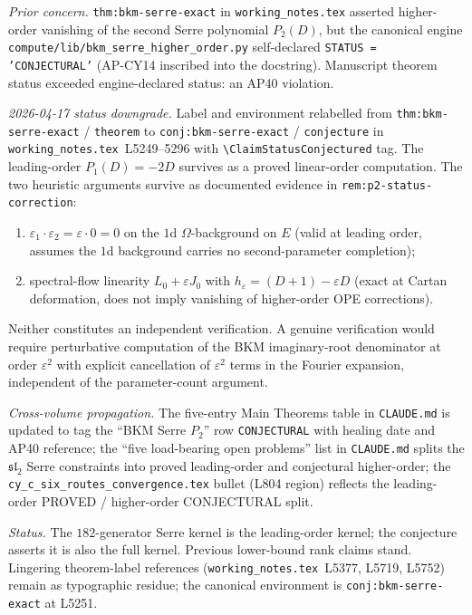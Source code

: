 \emph{Prior concern.}  \texttt{thm:bkm-serre-exact} in
\texttt{working\_notes.tex} asserted higher-order vanishing of the
second Serre polynomial $P_2(D)$, but the canonical engine
\texttt{compute/lib/bkm\_serre\_higher\_order.py} self-declared
\texttt{STATUS = 'CONJECTURAL'} (AP-CY14 inscribed into the docstring).
Manuscript theorem status exceeded engine-declared status: an AP40
violation.

\emph{2026-04-17 status downgrade.}  Label and environment relabelled
from \texttt{thm:bkm-serre-exact} / \texttt{theorem} to
\texttt{conj:bkm-serre-exact} / \texttt{conjecture} in
\texttt{working\_notes.tex}~L5249--5296 with
\texttt{\textbackslash ClaimStatusConjectured} tag.  The leading-order
$P_1(D) = -2D$ survives as a proved linear-order computation.  The
two heuristic arguments survive as documented evidence in
\texttt{rem:p2-status-correction}:
\begin{enumerate}[label=\textup{(\roman*)}]
 \item $\varepsilon_1 \cdot \varepsilon_2 = \varepsilon \cdot 0 = 0$
  on the $1$d $\Omega$-background on $E$ (valid at leading order,
  assumes the $1$d background carries no second-parameter completion);
 \item spectral-flow linearity $L_0 + \varepsilon J_0$ with
  $h_\varepsilon = (D + 1) - \varepsilon D$ (exact at Cartan
  deformation, does not imply vanishing of higher-order OPE
  corrections).
\end{enumerate}
Neither constitutes an independent verification.  A genuine
verification would require perturbative computation of the BKM
imaginary-root denominator at order $\varepsilon^2$ with explicit
cancellation of $\varepsilon^2$ terms in the Fourier expansion,
independent of the parameter-count argument.

\emph{Cross-volume propagation.}  The five-entry Main Theorems table
in \texttt{CLAUDE.md} is updated to tag the ``BKM Serre $P_2$'' row
\texttt{CONJECTURAL} with healing date and AP40 reference; the
``five load-bearing open problems'' list in \texttt{CLAUDE.md}
splits the $\mathfrak{sl}_2$ Serre constraints into proved
leading-order and conjectural higher-order; the
\texttt{cy\_c\_six\_routes\_convergence.tex} bullet (L804 region)
reflects the leading-order PROVED / higher-order CONJECTURAL split.

\emph{Status.}  \ClaimStatusHealed{}  The $182$-generator Serre kernel
is the leading-order kernel; the conjecture asserts it is also the
full kernel.  Previous lower-bound rank claims stand.  Lingering
theorem-label references (\texttt{working\_notes.tex}~L5377, L5719,
L5752) remain as typographic residue; the canonical environment is
\texttt{conj:bkm-serre-exact} at L5251.

